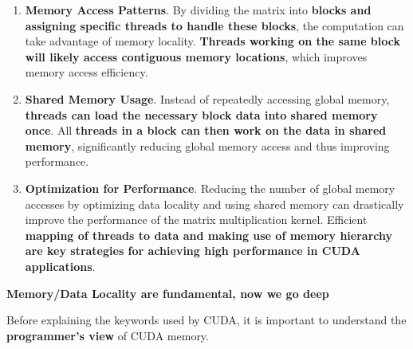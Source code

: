 \begin{enumerate}[label=\textcolor{Green3}{\faIcon{check}}]
    \item \textcolor{Green3}{\textbf{Memory Access Patterns}}. By dividing the matrix into \textbf{blocks and assigning specific threads to handle these blocks}, the computation can take advantage of memory locality. \textbf{Threads working on the same block will likely access contiguous memory locations}, which improves memory access efficiency.
 
    \item \textcolor{Green3}{\textbf{Shared Memory Usage}}. Instead of repeatedly accessing global memory, \textbf{threads can load the necessary block data into shared memory once}. All \textbf{threads in a block can then work on the data in shared memory}, significantly reducing global memory access and thus improving performance.
 
    \item \textcolor{Green3}{\textbf{Optimization for Performance}}. Reducing the number of global memory accesses by optimizing data locality and using shared memory can drastically improve the performance of the matrix multiplication kernel. Efficient \textbf{mapping of threads to data and making use of memory hierarchy are key strategies for achieving high performance in CUDA applications}.
\end{enumerate}

\begin{flushleft}
    \textcolor{Red2}{ \textbf{Memory/Data Locality are fundamental, now we go deep}}
\end{flushleft}
Before explaining the keywords used by CUDA, it is important to understand the \textbf{programmer's view} of CUDA memory.

